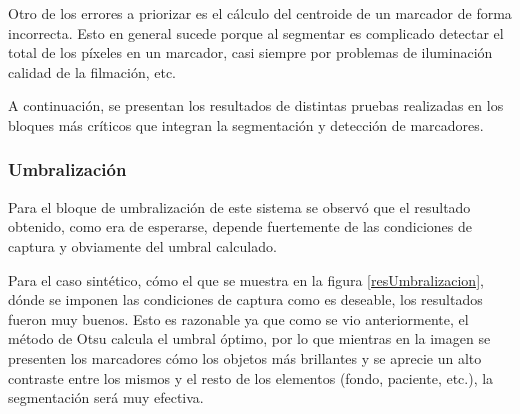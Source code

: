 Otro de los errores a priorizar es el cálculo del centroide de un marcador de forma incorrecta. Esto en general sucede porque al segmentar es complicado detectar el total de los píxeles en un marcador, casi siempre por problemas de iluminación calidad de la filmación, etc.

A continuación, se presentan los resultados de distintas pruebas realizadas en los bloques más críticos que integran la segmentación y detección de marcadores.

\subsubsection{Umbralización}

Para el bloque de umbralización de este sistema se observó que el resultado obtenido, como era de esperarse, depende fuertemente de las condiciones de captura y obviamente del umbral calculado. 

Para el caso sintético, cómo el que se muestra en la figura \ref{resUmbralizacion}, dónde se imponen las condiciones de captura como es deseable, los resultados fueron muy buenos. Esto es razonable ya que como se vio anteriormente, el método de Otsu\cite{otsu} calcula el umbral óptimo, por lo que mientras en la imagen se presenten los marcadores cómo los objetos más brillantes y se aprecie un alto contraste entre los mismos y el resto de los elementos (fondo, paciente, etc.), la segmentación será muy efectiva.

